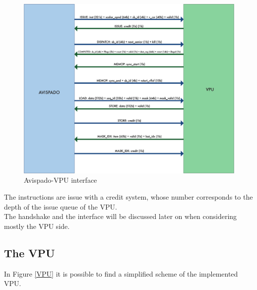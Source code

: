 \begin{figure}[H]
    \centering
    \includegraphics[scale = 0.6]{Chapter_1/img/avi-vpu.png}
    \caption{Avispado-VPU interface}
    \label{avi-vpu}
\end{figure}


The instructions are issue with a credit system, whose number corresponds to the  depth of the issue queue of the VPU.\\

The handshake and the interface will be discussed later on when considering mostly the VPU side.



\subsection{The VPU}
In Figure \ref{VPU} it is possible to find a simplified scheme of the implemented VPU.\\

